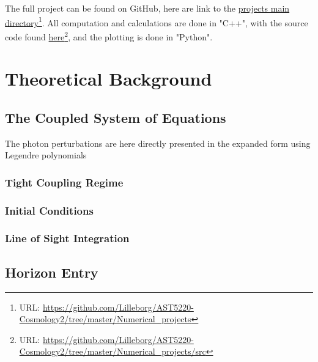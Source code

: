 \documentclass[10pt,a4paper]{article}
\begin{document}
The full project can be found on GitHub, here are link to the \href{https://github.com/Lilleborg/AST5220-Cosmology2/tree/master/Numerical_projects}{projects main directory}\footnote{URL: \url{https://github.com/Lilleborg/AST5220-Cosmology2/tree/master/Numerical_projects}}. All computation and calculations are done in "C++", with the source code found \href{https://github.com/Lilleborg/AST5220-Cosmology2/tree/master/Numerical_projects/src}{here}\footnote{URL: \url{https://github.com/Lilleborg/AST5220-Cosmology2/tree/master/Numerical_projects/src}}, and the plotting is done in "Python".

\section{Theoretical Background}
\label{sec:Theory}

\subsection{The Coupled System of Equations}
\label{subsec:Theory/Coupled equations}

The photon perturbations are here directly presented in the expanded form using Legendre polynomials 

    \subsubsection{Tight Coupling Regime}
    \label{subsubsec:Theory/Tight Coupling}

    \subsubsection{Initial Conditions}
    \label{subsubsec:Theory/Initial conditions}

    \subsubsection{Line of Sight Integration}
    \label{subsubsec:Theory/LoS Integration}

\subsection{Horizon Entry}
\label{subsec:Theory/Horizon entry}
\end{document}
